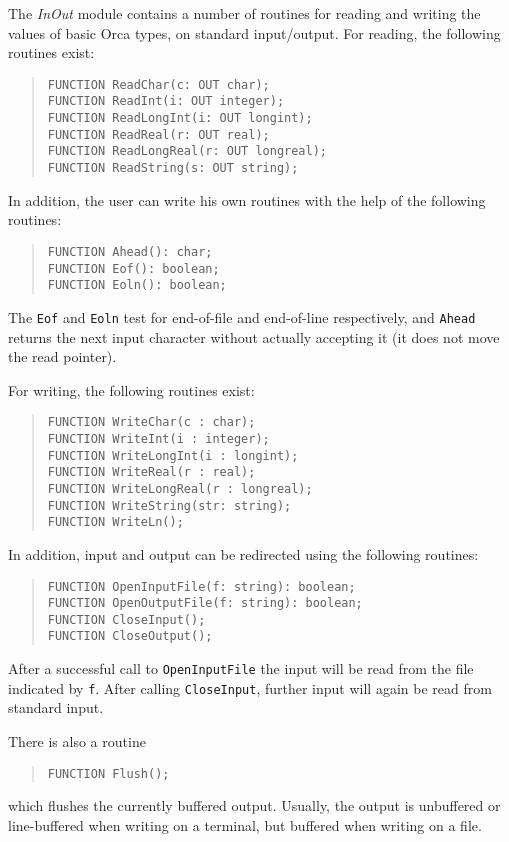 \documentclass[10pt]{article}
\begin{document}
The {\em InOut} module contains a number of routines for reading and writing
the values of basic Orca types, on standard input/output.
For reading, the following routines exist:
\begin{quote}
\begin{verbatim}
FUNCTION ReadChar(c: OUT char);
FUNCTION ReadInt(i: OUT integer);
FUNCTION ReadLongInt(i: OUT longint);
FUNCTION ReadReal(r: OUT real);
FUNCTION ReadLongReal(r: OUT longreal);
FUNCTION ReadString(s: OUT string);
\end{verbatim}
\end{quote}
In addition, the user can write his own routines with the help of the
following routines:
\begin{quote}
\begin{verbatim}
FUNCTION Ahead(): char;
FUNCTION Eof(): boolean;
FUNCTION Eoln(): boolean;
\end{verbatim}
\end{quote}
The \verb+Eof+ and \verb+Eoln+ test for end-of-file and end-of-line
respectively, and \verb+Ahead+ returns the next input character
without actually accepting it (it does not move the read pointer).

For writing, the following routines exist:
\begin{quote}
\begin{verbatim}
FUNCTION WriteChar(c : char);
FUNCTION WriteInt(i : integer);
FUNCTION WriteLongInt(i : longint);
FUNCTION WriteReal(r : real);
FUNCTION WriteLongReal(r : longreal);
FUNCTION WriteString(str: string);
FUNCTION WriteLn();
\end{verbatim}
\end{quote}
In addition, input and output can be redirected using the following routines:
\begin{quote}
\begin{verbatim}
FUNCTION OpenInputFile(f: string): boolean;
FUNCTION OpenOutputFile(f: string): boolean;
FUNCTION CloseInput();
FUNCTION CloseOutput();
\end{verbatim}
\end{quote}
After a successful call to \verb+OpenInputFile+ the input will be read from
the file indicated by \verb+f+.
After calling \verb+CloseInput+, further input will again be read from
standard input.

There is also a routine
\begin{quote}
\begin{verbatim}
FUNCTION Flush();
\end{verbatim}
\end{quote}
which flushes the currently buffered output. Usually, the output is
unbuffered or line-buffered when writing on a terminal, but buffered
when writing on a file.
\end{document}
